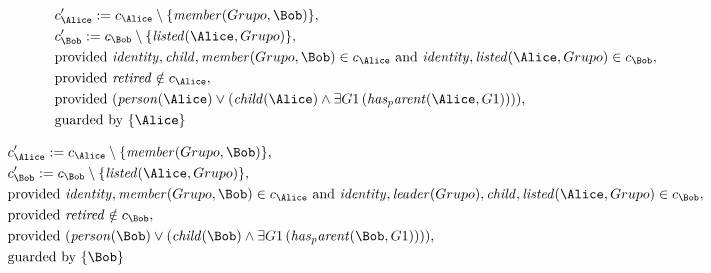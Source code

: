 \begin{align*}
&
c'_
{
\Alice
}
 := 
c_
{
\Alice
}
 \setminus 
\{
\mathit{
member
}
(
Grupo
,
\Bob
)
\}
,\\
&
c'_
{
\Bob
}
 := 
c_
{
\Bob
}
 \setminus 
\{
\mathit{
listed
}
(
\Alice
,
Grupo
)
\}
,\\
&
\text{provided } 
\mathit{
identity
}
,
\mathit{
child
}
,
\mathit{
member
}
(
Grupo
,
\Bob
)
 \in c_
{
\Alice
}
 \text{ and } 
\mathit{
identity
}
,
\mathit{
listed
}
(
\Alice
,
Grupo
)
 \in c_
{
\Bob
}
,\\
&
\text{provided } 
\mathit{
retired
}
 \notin c_
{
\Alice
}
,\\
&
\text{provided } 
(
\mathit{
person
}
(
\Alice
)
\lor
(
\mathit{
child
}
(
\Alice
)
\land
\exists 
G1
\,(
\mathit{
has_parent
}
(
\Alice
,
G1
)
)
)
)
,\\
&
\text{guarded by } \{
\Alice
\}
\end{align*}

\begin{align*}
&
c'_
{
\Alice
}
 := 
c_
{
\Alice
}
 \setminus 
\{
\mathit{
member
}
(
Grupo
,
\Bob
)
\}
,\\
&
c'_
{
\Bob
}
 := 
c_
{
\Bob
}
 \setminus 
\{
\mathit{
listed
}
(
\Alice
,
Grupo
)
\}
,\\
&
\text{provided } 
\mathit{
identity
}
,
\mathit{
member
}
(
Grupo
,
\Bob
)
 \in c_
{
\Alice
}
 \text{ and } 
\mathit{
identity
}
,
\mathit{
leader
}
(
Grupo
)
,
\mathit{
child
}
,
\mathit{
listed
}
(
\Alice
,
Grupo
)
 \in c_
{
\Bob
}
,\\
&
\text{provided } 
\mathit{
retired
}
 \notin c_
{
\Bob
}
,\\
&
\text{provided } 
(
\mathit{
person
}
(
\Bob
)
\lor
(
\mathit{
child
}
(
\Bob
)
\land
\exists 
G1
\,(
\mathit{
has_parent
}
(
\Bob
,
G1
)
)
)
)
,\\
&
\text{guarded by } \{
\Bob
\}
\end{align*}

